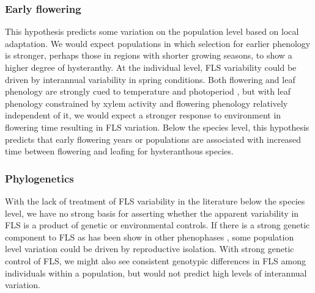 \documentclass[12pt]{article}\usepackage[]{graphicx}\usepackage[]{color}
\begin{document}
\subsubsection*{Early flowering} 
\indent\indent This hypothesis predicts some variation on the population level based on local adaptation.  We would expect populations in which selection for earlier phenology is stronger, perhaps those in regions with shorter growing seasons, to show a higher degree of hysteranthy.  At the individual level, FLS variability could be driven by interannual variability in spring conditions. Both flowering and leaf phenology are strongly cued to temperature and photoperiod \citep{Flynn2018,Rathcke_1985}, but with leaf phenology constrained by xylem activity and flowering phenology relatively independent of it, we would expect a stronger response to environment in flowering time resulting in FLS variation.  Below the species level, this hypothesis predicts that early flowering years or populations are associated with increased time between flowering and leafing for hysteranthous species.
\subsubsection*{Phylogenetics} 
\indent\indent With the lack of treatment of FLS variability in the literature below the species level, we have no strong basis for asserting whether the apparent variability in FLS is a product of genetic or environmental controls. If there is a strong genetic component to FLS as has been show in other phenophases \citep{Wilczek2010}, some population level variation could be driven by reproductive isolation. With strong genetic control of FLS, we might also see consistent genotypic differences in FLS among individuals within a population, but would not predict high levels of interannual variation.\\

\end{document}
